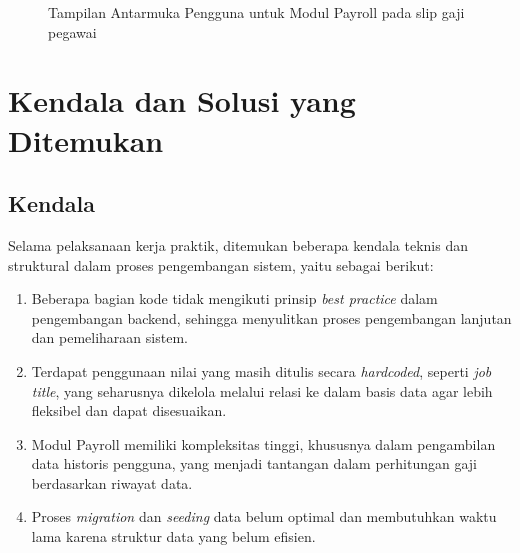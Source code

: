 \begin{figure}[H]
\centering
{}
\caption{Tampilan Antarmuka Pengguna untuk Modul Payroll pada slip gaji pegawai}
\label{fig:salary_slip_detail}
\end{figure}







\section{Kendala dan Solusi yang Ditemukan}

\subsection{Kendala}
Selama pelaksanaan kerja praktik, ditemukan beberapa kendala teknis dan struktural dalam proses pengembangan sistem, yaitu sebagai berikut:
\begin{enumerate}
\item Beberapa bagian kode tidak mengikuti prinsip \textit{best practice} dalam pengembangan backend, sehingga menyulitkan proses pengembangan lanjutan dan pemeliharaan sistem.
\item Terdapat penggunaan nilai yang masih ditulis secara \textit{hardcoded}, seperti \textit{job title}, yang seharusnya dikelola melalui relasi ke dalam basis data agar lebih fleksibel dan dapat disesuaikan.
\item Modul Payroll memiliki kompleksitas tinggi, khususnya dalam pengambilan data historis pengguna, yang menjadi tantangan dalam perhitungan gaji berdasarkan riwayat data.
\item Proses \textit{migration} dan \textit{seeding} data belum optimal dan membutuhkan waktu lama karena struktur data yang belum efisien.
\end{enumerate}

